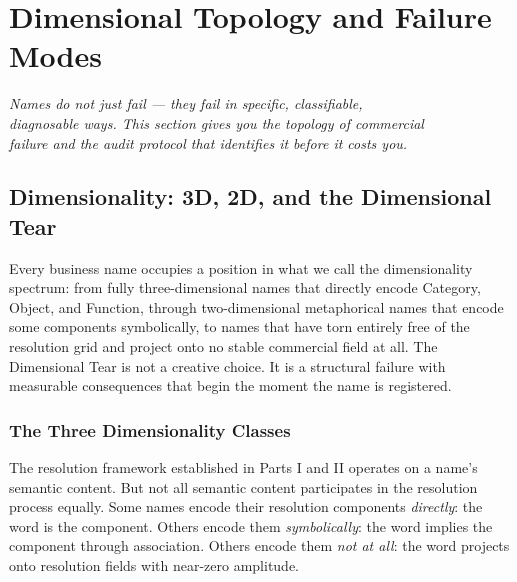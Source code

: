\documentclass[12pt, openany]{book}
\theoremstyle{thmstyle}
\theoremstyle{defstyle}
\begin{document}
\tableofcontents
\newpage

\part{Dimensional Topology and Failure Modes}

\vspace{16pt}
\begin{center}
\color{accentgray}\itshape
Names do not just fail --- they fail in specific, classifiable,\\
diagnosable ways. This section gives you the topology of commercial\\
failure and the audit protocol that identifies it before it costs you.
\end{center}

\chapter{Dimensionality: 3D, 2D, and the Dimensional Tear}

\begin{keybox}
Every business name occupies a position in what we call the dimensionality spectrum: from fully three-dimensional names that directly encode Category, Object, and Function, through two-dimensional metaphorical names that encode some components symbolically, to names that have torn entirely free of the resolution grid and project onto no stable commercial field at all. The Dimensional Tear is not a creative choice. It is a structural failure with measurable consequences that begin the moment the name is registered.
\end{keybox}

\section{The Three Dimensionality Classes}

The resolution framework established in Parts I and II operates on a name's semantic content. But not all semantic content participates in the resolution process equally. Some names encode their resolution components \textit{directly}: the word is the component. Others encode them \textit{symbolically}: the word implies the component through association. Others encode them \textit{not at all}: the word projects onto resolution fields with near-zero amplitude.
\end{document}
